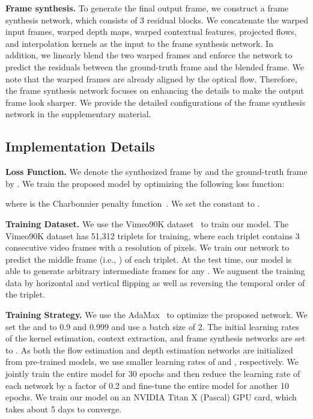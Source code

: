 \documentclass[10pt,twocolumn,letterpaper]{article}
\newcommand{\Paragraph}[1]{{\vspace{-2mm}\flushleft\textbf{#1}}} \newcommand{\ul}[1]{\underline{\smash{#1}}}
\begin{document}
	
	
	\Paragraph{Frame synthesis.}
To generate the final output frame, we construct a frame synthesis network, which consists of 3 residual blocks.
We concatenate the warped input frames, warped depth maps, warped contextual features, projected flows, and interpolation kernels as the input to the frame synthesis network.
In addition, we linearly blend the two warped frames and enforce the network to predict the residuals between the ground-truth frame and the blended frame.
We note that the warped frames are already aligned by the optical flow.
Therefore, the frame synthesis network focuses on enhancing the details to make the output frame look sharper.
We provide the detailed configurations of the frame synthesis network in the supplementary material.
	
	
	
	\subsection{Implementation Details}
\Paragraph{Loss Function.}
We denote the synthesized frame by  and the ground-truth frame by .
We train the proposed model by optimizing the following loss function:

where  is the Charbonnier penalty function~\cite{charbonnier1994two}.
We set the constant  to .


	
	\Paragraph{Training Dataset.}
We use the Vimeo90K dataset~\cite{xue2017video} to train our model.
The Vimeo90K dataset has 51,312 triplets for training, where each triplet contains 3 consecutive video frames with a resolution of  pixels.
We train our network to predict the middle frame (i.e., ) of each triplet.
At the test time, our model is able to generate arbitrary intermediate frames for any .
We augment the training data by horizontal and vertical flipping as well as reversing the temporal order of the triplet.
	
	
	
	\Paragraph{Training Strategy.}
We use the AdaMax~\cite{kingma2015adam} to optimize the proposed network.
We set the  and  to 0.9 and 0.999 and use a batch size of 2.
The initial learning rates of the kernel estimation, context extraction, and frame synthesis networks are set to .
As both the flow estimation and depth estimation networks are initialized from pre-trained models, we use smaller learning rates of  and , respectively.
We jointly train the entire model for 30 epochs and then reduce the learning rate of each network by a factor of 0.2 and fine-tune the entire model for another 10 epochs.
We train our model on an NVIDIA Titan X (Pascal) GPU card, which takes about 5 days to converge.
\end{document}
